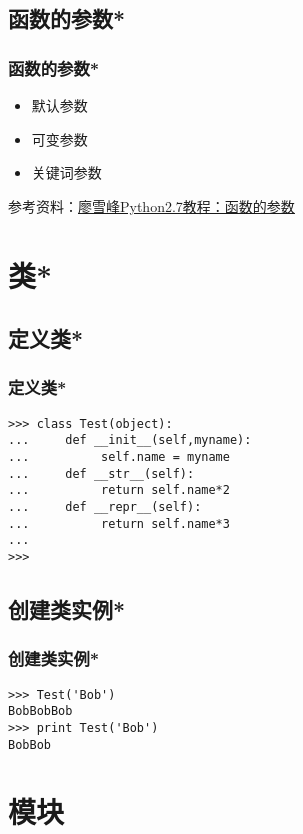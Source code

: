\documentclass[13pt]{beamer}
\begin{document}
\subsection{函数的参数*}
\begin{frame}
\frametitle{函数的参数*}
\begin{itemize}
  \item 默认参数
  \item 可变参数
  \item 关键词参数
\end{itemize}
参考资料：\href{http://www.liaoxuefeng.com/wiki/001374738125095c955c1e6d8bb493182103fac9270762a000/001374738449338c8a122a7f2e047899fc162f4a7205ea3000}
{\underline{廖雪峰Python2.7教程：函数的参数}}
\end{frame}
 
\section{类*}
\subsection{定义类*}
\begin{frame}[containsverbatim]
\frametitle{定义类*}
\begin{lstlisting}
>>> class Test(object):
...     def __init__(self,myname):
...          self.name = myname
...     def __str__(self):
...          return self.name*2
...     def __repr__(self):
...          return self.name*3
...
>>>
\end{lstlisting}
\end{frame}

\subsection{创建类实例*}
\frametitle{创建类实例*}
\begin{frame}[containsverbatim]
\begin{lstlisting}
>>> Test('Bob')
BobBobBob
>>> print Test('Bob')
BobBob
\end{lstlisting}
\end{frame}

\section{模块}
\end{document}
